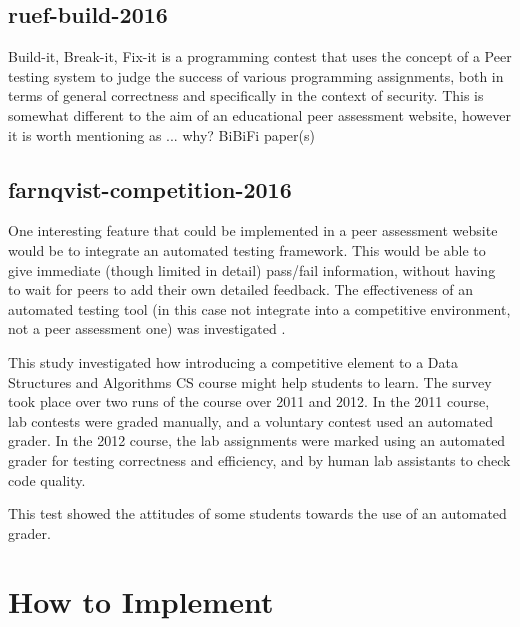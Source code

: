 \documentclass[a4paper,11pt]{report}
\begin{document}
\subsection{ruef-build-2016}
Build-it, Break-it, Fix-it\cite{ruef_build_2016}\cite{ruef_build_2015} is a programming contest that uses the concept of a Peer testing system to judge the success of various programming assignments, both in terms of general correctness and specifically in the context of security. This is somewhat different to the aim of an educational peer assessment website, however it is worth mentioning as ... why?
BiBiFi paper(s)\par

\subsection{farnqvist-competition-2016}
One interesting feature that could be implemented in a peer assessment website would be to integrate an automated testing framework. This would be able to give immediate (though limited in detail) pass/fail information, without having to wait for peers to add their own detailed feedback. The effectiveness of an automated testing tool (in this case not integrate into a competitive environment, not a peer assessment one) was investigated \cite{farnqvist_competition_2016}.\par
This study investigated how introducing a competitive element to a Data Structures and Algorithms CS course might help students to learn. The survey took place over two runs of the course over 2011 and 2012. In the 2011 course, lab contests were graded manually, and a voluntary contest used an automated grader. In the 2012 course, the lab assignments were marked using an automated grader for testing correctness and efficiency, and by human lab assistants to check code quality.\par
This test showed the attitudes of some students towards the use of an automated grader.


\section{How to Implement}
\end{document}
